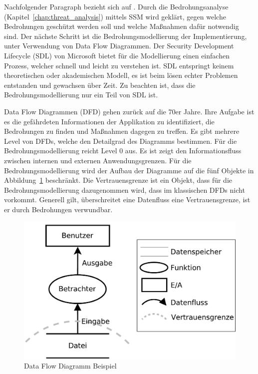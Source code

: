 \documentclass[11pt,a4paper]{report}
\begin{document}
Nachfolgender Paragraph bezieht sich auf \cite{gutmann10}.
Durch die Bedrohungsanalyse (Kapitel~\ref{chap:threat_analysis}) mittels SSM wird geklärt, gegen welche Bedrohungen geschützt werden soll und welche Maßnahmen dafür notwendig sind. Der nächste Schritt ist die Bedrohungsmodellierung der Implementierung, unter Verwendung von Data Flow Diagrammen. Der Security Development Lifecycle (SDL) von Microsoft bietet für die Modellierung einen einfachen Prozess, welcher schnell und leicht zu verstehen ist. SDL entspringt keinem theoretischen oder akademischen Modell, es ist beim lösen echter Problemen entstanden und gewachsen über Zeit. Zu beachten ist, dass die Bedrohungsmodellierung nur ein Teil von SDL ist. 

Data Flow Diagrammen (DFD) gehen zurück auf die 70er Jahre. Ihre Aufgabe ist es die gefährdeten Informationen der Applikation zu identifiziert, die Bedrohungen zu finden und Maßnahmen dagegen zu treffen. Es gibt mehrere Level von DFDs, welche den Detailgrad des Diagramms bestimmen. Für die Bedrohungsmodellierung reicht Level 0 aus. Es ist zeigt den Informationsfluss zwischen internen und externen Anwendungsgrenzen. Für die Bedrohungsmodellierung wird der Aufbau der Diagramme auf die fünf Objekte in Abbildung~\ref{fig:dfd_intro} beschränkt. Die Vertrauensgrenze ist ein Objekt, dass für die Bedrohungsmodellierung dazugenommen wird, dass im klassischen DFDs nicht vorkommt. Generell gilt, überschreitet eine Datenfluss eine Vertrauensgrenze, ist er durch Bedrohungen verwundbar.

\begin{figure}[htbp]
\centering
\includegraphics[scale=0.4]{images/dfd_intro.pdf}
\caption{Data Flow Diagramm Beispiel}
\label{fig:dfd_intro}
\end{figure}
\end{document}
